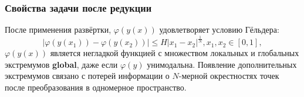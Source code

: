 \documentclass[aspectratio=1610]{beamer}
\begin{document}
\begin{frame}
  \frametitle{Свойства задачи после редукции}
  После применения развёртки, \(\varphi(y(x))\) удовлетворяет условию Гёльдера:
  \begin{displaymath}
    |\varphi(y(x_1))-\varphi(y(x_2))|\leq H{|x_1-x_2|}^{\frac{1}{N}}, x_1,x_2\in[0,1],
  \end{displaymath}
  \(\varphi(y(x))\) является негладкой функцией с множеством локальных и глобальных экстремумов \textbf{global}, даже если \(\varphi(y)\) унимодальна.
  Появление дополнительных экстремумов связано с потерей информации о \(N\)-мерной окрестностях точек после преобразования в одномерное пространство.

  \begin{figure}[ht]
    \begin{center}

    \vspace*{-0.5cm}
  \end{center}
  \end{figure}
\end{frame}
\end{document}
